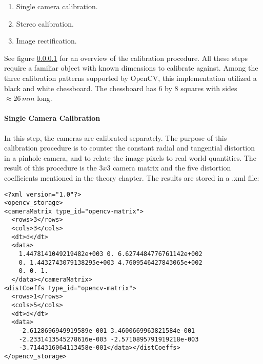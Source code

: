 \begin{enumerate}
	\item Single camera calibration.
	\item Stereo calibration.
	\item Image rectification.
\end{enumerate}

See figure \ref{} for an overview of the calibration procedure. All these steps require a familiar object with known dimensions to calibrate against. Among the three calibration patterns supported by OpenCV, this implementation utilized a black and white chessboard. The chessboard has 6 by 8 squares with sides $\approx 26 \, mm$ long.


\paragraph{Single Camera Calibration}

In this step, the cameras are calibrated separately.  The purpose of this calibration procedure is to counter the constant radial and tangential distortion in a pinhole camera, and to relate the image pixels to real world quantities. The result of this procedure is the $3x3$ camera matrix and the five distortion coefficients mentioned in the theory chapter. The results are stored in a .xml file:

\begin{verbatim}
<?xml version="1.0"?>
<opencv_storage>
<cameraMatrix type_id="opencv-matrix">
  <rows>3</rows>
  <cols>3</cols>
  <dt>d</dt>
  <data>
    1.4478141049219482e+003 0. 6.6274484776761142e+002 
    0. 1.4432743079138295e+003 4.7609546427843065e+002 
    0. 0. 1.
  </data></cameraMatrix>
<distCoeffs type_id="opencv-matrix">
  <rows>1</rows>
  <cols>5</cols>
  <dt>d</dt>
  <data>
    -2.6128696949919589e-001 3.4600669963821584e-001
    -2.2331413545278616e-003 -2.5710895791919218e-003
    -3.7144316064113458e-001</data></distCoeffs>
</opencv_storage>
\end{verbatim}

\newpage

